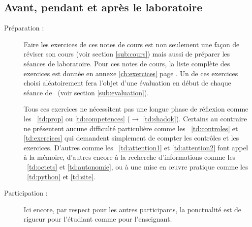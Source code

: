 \subsection{Avant, pendant et après le laboratoire}
\begin{description}
\item[Préparation :] \mbox{}
	Faire les exercices de ces notes de cours
	est non seulement une façon de réviser son cours (voir section \ref{sub:cours})
	mais aussi de préparer les séances de laboratoire.
	Pour ces notes de cours, la liste complète des exercices est donnée en 
	annexe \ref{ch:exercices} page \pageref{ch:exercices}.
	Un de ces exercices choisi aléatoirement fera l'objet d'une
	évaluation en début de chaque séance de \tdir\ (voir section \ref{sub:evaluation}).
	
	Tous ces exercices ne nécessitent pas une longue phase de réflexion comme
	les \tdir\ \ref{td:prop} ou \ref{td:competences} ($\rightarrow$ \ref{td:shadok}).
	Certains au contraire ne présentent aucune difficulté particulière
	comme les \tdir\ \ref{td:controles} et \ref{td:exercices}
	qui demandent simplement de compter les contrôles et les exercices.
	D'autres comme les \tdir\ \ref{td:attention1} et \ref{td:attention2} 
	font appel à la mémoire, d'autres encore à la recherche d'informations
	comme les \tdir\ \ref{td:octets} et \ref{td:autonomie}, ou à une mise en
	\oe uvre pratique comme les \tdir\ \ref{td:python} et \ref{td:site}.
\item[Participation :] \mbox{}
	Ici encore, par respect pour les autres participants, 
	la ponctualité est de rigueur pour l'étudiant comme pour l'enseignant.


\end{description}
